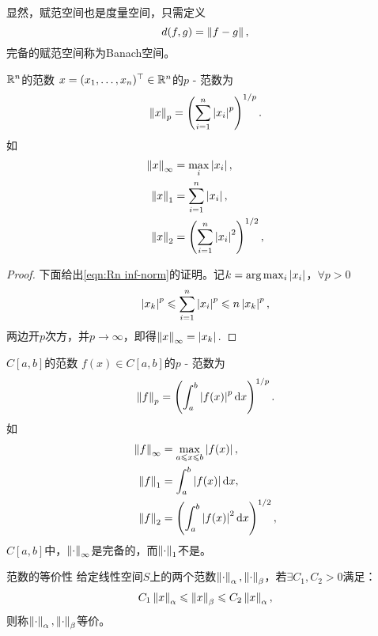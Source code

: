 显然，赋范空间也是度量空间，只需定义
\[
    d(f,g)=\left\lVert f-g\right\rVert,
\]
完备的赋范空间称为Banach空间。

\begin{example}
    {$\mathbb R^n$的范数}{}
    $x=(x_1,\ldots,x_n)^\top\in\mathbb R^n$的$p$ - 范数为
    \[
        \left\lVert x\right\rVert_p=\left(\sum_{i=1}^n\left\lvert x_i\right\rvert^p\right)^{1/p}.
    \]
    如
    \begin{subequations}
        \begin{align}
            \label{eqn:Rn inf-norm}
            \left\lVert x\right\rVert_\infty&=\max_{i}\left\lvert x_i\right\rvert,\\
            \label{eqn:Rn 1-norm}
            \left\lVert x\right\rVert_1&=\sum_{i=1}^n\left\lvert x_i\right\rvert,\\
            \label{eqn:Rn 2-norm}
            \left\lVert x\right\rVert_2&=\left(\sum_{i=1}^n\left\lvert x_i\right\rvert^2\right)^{1/2},
        \end{align}
    \end{subequations}
    \begin{proof}
        下面给出\eqref{eqn:Rn inf-norm}的证明。记$k=\arg\max_i\left\lvert x_i\right\rvert$，$\forall p>0$
        \[
            \left\lvert x_k\right\rvert^p\leqslant\sum_{i=1}^n\left\lvert x_i\right\rvert^p\leqslant n\left\lvert x_k\right\rvert^p,
        \]
        两边开$p$次方，并$p\to\infty$，即得$\left\lVert x\right\rVert_\infty=\left\lvert x_k\right\rvert.$
    \end{proof}
\end{example}

\begin{example}
    {$C[a,b]$的范数}{}
    $f(x)\in C[a,b]$的$p$ - 范数为
    \[
        \left\lVert f\right\rVert_p=\left(\int_a^b\left\lvert f(x)\right\rvert^p\mathop{}\!\mathrm{d} x\right)^{1/p}.
    \]
    如
    \begin{subequations}
        \begin{align}
            \left\lVert f\right\rVert_\infty&=\max_{a\leqslant x\leqslant b}\left\lvert f(x)\right\rvert,\\
            \left\lVert f\right\rVert_1&=\int_a^b\left\lvert f(x)\right\rvert\mathop{}\!\mathrm{d} x,\\
            \left\lVert f\right\rVert_2&=\left(\int_a^b\left\lvert f(x)\right\rvert^2\mathop{}\!\mathrm{d} x\right)^{1/2},
        \end{align}
    \end{subequations}
    $C[a,b]$中，$\left\lVert\cdot\right\rVert_\infty$是完备的，而$\left\lVert\cdot\right\rVert_1$不是。
\end{example}

\begin{definition}
    {范数的等价性}{}
    给定线性空间$S$上的两个范数$\left\lVert\cdot\right\rVert_\alpha,\left\lVert\cdot\right\rVert_\beta$，若$\exists C_1,C_2>0$满足：
    \[
        C_1\left\lVert x\right\rVert_\alpha\leqslant\left\lVert x\right\rVert_\beta\leqslant C_2\left\lVert x\right\rVert_\alpha,
    \]
    则称$\left\lVert\cdot\right\rVert_\alpha,\left\lVert\cdot\right\rVert_\beta$等价。
\end{definition}

